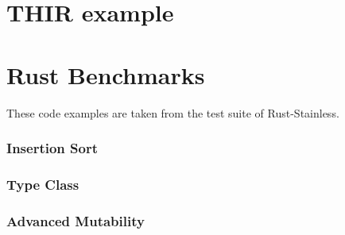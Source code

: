\section{THIR example}


\clearpage
\section{Rust Benchmarks}

These code examples are taken from the test suite of Rust-Stainless.

\subsubsection{Insertion Sort}


\subsubsection{Type Class}


\subsubsection{Advanced Mutability}

